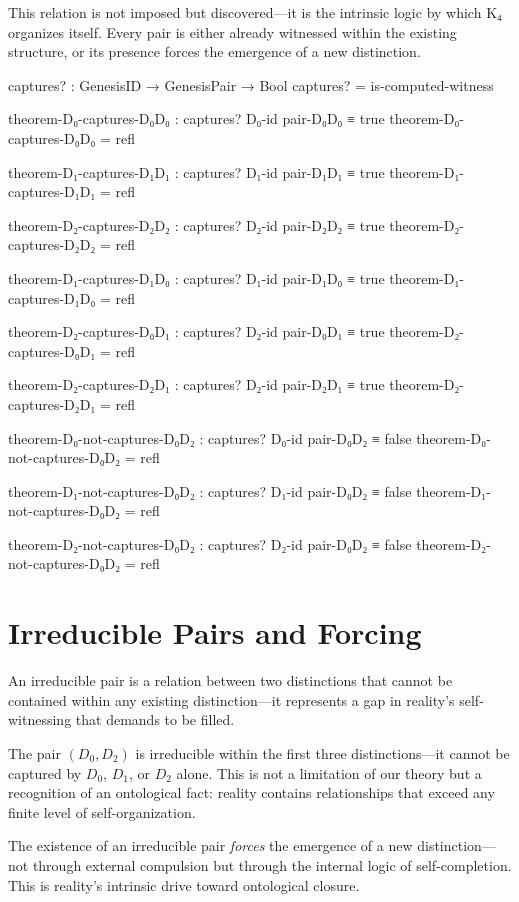 \documentclass[11pt,a4paper]{book}
\begin{document}
This relation is not imposed but discovered—it is the intrinsic logic by which K₄ organizes itself.
Every pair is either already witnessed within the existing structure, or its presence forces the emergence of a new distinction.

\begin{code}
captures? : GenesisID → GenesisPair → Bool
captures? = is-computed-witness

theorem-D₀-captures-D₀D₀ : captures? D₀-id pair-D₀D₀ ≡ true
theorem-D₀-captures-D₀D₀ = refl

theorem-D₁-captures-D₁D₁ : captures? D₁-id pair-D₁D₁ ≡ true
theorem-D₁-captures-D₁D₁ = refl

theorem-D₂-captures-D₂D₂ : captures? D₂-id pair-D₂D₂ ≡ true
theorem-D₂-captures-D₂D₂ = refl

theorem-D₁-captures-D₁D₀ : captures? D₁-id pair-D₁D₀ ≡ true
theorem-D₁-captures-D₁D₀ = refl

theorem-D₂-captures-D₀D₁ : captures? D₂-id pair-D₀D₁ ≡ true
theorem-D₂-captures-D₀D₁ = refl

theorem-D₂-captures-D₂D₁ : captures? D₂-id pair-D₂D₁ ≡ true
theorem-D₂-captures-D₂D₁ = refl

theorem-D₀-not-captures-D₀D₂ : captures? D₀-id pair-D₀D₂ ≡ false
theorem-D₀-not-captures-D₀D₂ = refl

theorem-D₁-not-captures-D₀D₂ : captures? D₁-id pair-D₀D₂ ≡ false
theorem-D₁-not-captures-D₀D₂ = refl

theorem-D₂-not-captures-D₀D₂ : captures? D₂-id pair-D₀D₂ ≡ false
theorem-D₂-not-captures-D₀D₂ = refl
\end{code}

\section{Irreducible Pairs and Forcing}

An irreducible pair is a relation between two distinctions that cannot be contained within any existing distinction—it represents a gap in reality's self-witnessing that demands to be filled.

The pair $(D_0, D_2)$ is irreducible within the first three distinctions—it cannot be captured by $D_0$, $D_1$, or $D_2$ alone. This is not a limitation of our theory but a recognition of an ontological fact: reality contains relationships that exceed any finite level of self-organization.

The existence of an irreducible pair \emph{forces} the emergence of a new distinction—not through external compulsion but through the internal logic of self-completion. This is reality's intrinsic drive toward ontological closure.
\end{document}
